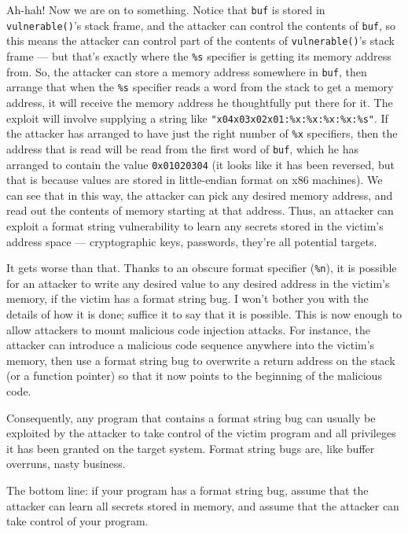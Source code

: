 \documentclass[11pt]{article}
\begin{document}
Ah-hah! Now we are on to something. Notice that \texttt{buf} is stored
in \texttt{vulnerable()}'s stack frame, and the attacker can control
the contents of \texttt{buf}, so this means the attacker can control
part of the contents of \texttt{vulnerable()}'s stack frame --- but
that's exactly where the \texttt{\%s} specifier is getting its memory
address from. So, the attacker can store a memory address somewhere in
\texttt{buf}, then arrange that when the \texttt{\%s} specifier reads
a word from the stack to get a memory address, it will receive the
memory address he thoughtfully put there for it. The exploit will
involve supplying a string like
\texttt{\mbox{"\\x04\\x03\\x02\\x01:\%x:\%x:\%x:\%x:\%s"}}.  If the
attacker has arranged to have just the right number of \texttt{\%x}
specifiers, then the address that is read will be read from the first
word of \texttt{buf}, which he has arranged to contain the value
\texttt{0x01020304} (it looks like it has been reversed, but that is
because values are stored in little-endian format on x86 machines). We
can see that in this way, the attacker can pick any desired memory
address, and read out the contents of memory starting at that
address. Thus, an attacker can exploit a format string vulnerability
to learn any secrets stored in the victim's address
space --- cryptographic keys, passwords, they're all potential targets.

It gets worse than that. Thanks to an obscure format specifier 
(\texttt{\%n}), it is possible for an attacker to write any desired value to any
desired address in the victim's memory, if the victim has a format
string bug. I won't bother you with the details of how it is done;
suffice it to say that it is possible. This is now enough to allow
attackers to mount malicious code injection attacks. For instance, the
attacker can introduce a malicious code sequence anywhere into the
victim's memory, then use a format string bug to overwrite a return
address on the stack (or a function pointer) so that it now points to
the beginning of the malicious code.  

Consequently, any program that
contains a format string bug can usually be exploited by the attacker
to take control of the victim program and all privileges it has been
granted on the target system. Format string bugs are, like buffer
overruns, nasty business.

The bottom line: if your program has a format string bug, assume that
the attacker can learn all secrets stored in memory, and assume that
the attacker can take control of your program.
\end{document}
